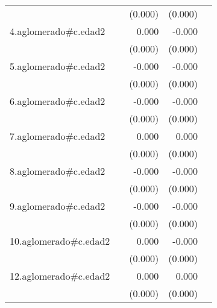 {\begin{longtable}{l*{4}{D{.}{.}{-1}}}
            &                     &     (0.000)         &     (0.000)         &                     \\
\addlinespace
4.aglomerado#c.edad2&                     &       0.000         &      -0.000         &                     \\
            &                     &     (0.000)         &     (0.000)         &                     \\
\addlinespace
5.aglomerado#c.edad2&                     &      -0.000         &      -0.000\sym{***}&                     \\
            &                     &     (0.000)         &     (0.000)         &                     \\
\addlinespace
6.aglomerado#c.edad2&                     &      -0.000         &      -0.000\sym{***}&                     \\
            &                     &     (0.000)         &     (0.000)         &                     \\
\addlinespace
7.aglomerado#c.edad2&                     &       0.000         &       0.000         &                     \\
            &                     &     (0.000)         &     (0.000)         &                     \\
\addlinespace
8.aglomerado#c.edad2&                     &      -0.000         &      -0.000         &                     \\
            &                     &     (0.000)         &     (0.000)         &                     \\
\addlinespace
9.aglomerado#c.edad2&                     &      -0.000         &      -0.000         &                     \\
            &                     &     (0.000)         &     (0.000)         &                     \\
\addlinespace
10.aglomerado#c.edad2&                     &       0.000         &      -0.000         &                     \\
            &                     &     (0.000)         &     (0.000)         &                     \\
\addlinespace
12.aglomerado#c.edad2&                     &       0.000         &       0.000         &                     \\
            &                     &     (0.000)         &     (0.000)         &                     \\

\end{longtable}}
